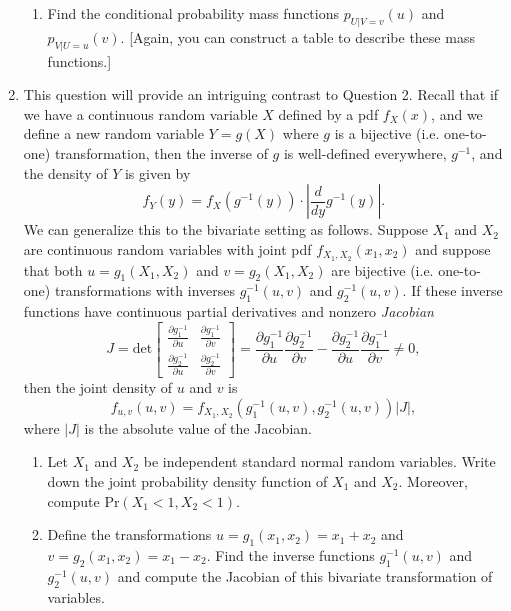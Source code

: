 \documentclass[11pt]{article}
\newcommand{\pr}{\text{Pr}}
\begin{document}
\begin{enumerate}[label=\textbf{Question \arabic*:},start=1]
\begin{enumerate}
	\item Find the conditional probability mass functions $p_{U|V = v}(u)$ and $p_{V|U=u}(v)$. [Again, you can construct a table to describe these mass functions.]\\

\end{enumerate}






\item 
This question will provide an intriguing contrast to Question 2. Recall that if we have a continuous random variable $X$ defined by a pdf $f_X(x)$, and we define a new random variable $Y = g(X)$ where $g$ is a bijective (i.e. one-to-one) transformation, then the inverse of $g$ is well-defined everywhere, $g^{-1}$, and the density of $Y$ is given by $$f_Y(y) = f_X(g^{-1}(y))\cdot \left| \frac d{dy} g^{-1}(y)\right|.$$ We can generalize this to the bivariate setting as follows. Suppose $X_1$ and $X_2$ are continuous random variables with joint pdf $f_{X_1,X_2}(x_1,x_2)$ and suppose that both $u = g_1(X_1,X_2)$ and $v = g_2(X_1,X_2)$ are bijective (i.e. one-to-one) transformations with inverses $g_1^{-1}(u,v)$ and $g_2^{-1}(u,v)$. If these inverse functions have continuous partial derivatives and nonzero {\em Jacobian} 
\[
J = \text{det}
\begin{bmatrix}
	\frac {\partial g_1^{-1}}{\partial u}	& \frac {\partial g_1^{-1}}{\partial v} \\
	\frac {\partial g_2^{-1}}{\partial u}	& \frac {\partial g_2^{-1}}{\partial v}
\end{bmatrix}
= \frac {\partial g_1^{-1}}{\partial u} \frac {\partial g_2^{-1}}{\partial v} - \frac {\partial g_2^{-1}}{\partial u} \frac {\partial g_1^{-1}}{\partial v} \neq 0,
\]
then the joint density of $u$ and $v$ is $$f_{u,v}(u,v) = f_{X_1,X_2}\left( g_1^{-1}(u,v), g_2^{-1}(u,v)\right) |J|,$$ where $|J|$ is the absolute value of the Jacobian.

\begin{enumerate}
  \item Let $X_1$ and $X_2$ be independent standard normal random variables. Write down the joint probability density function of $X_1$ and $X_2$. Moreover, compute $\pr(X_1<1,X_2<1)$.\\

  \item Define the transformations $u = g_1(x_1,x_2) = x_1 + x_2$ and $v = g_2(x_1,x_2) = x_1 - x_2$. Find the inverse functions $g_1^{-1}(u,v)$ and $g_2^{-1}(u,v)$ and compute the Jacobian of this bivariate transformation of variables.\\


\end{enumerate}
\end{enumerate}
\end{document}
